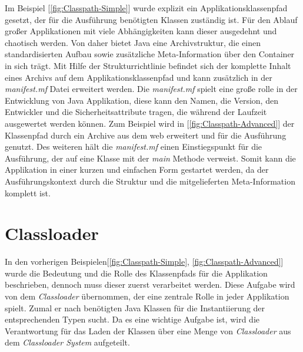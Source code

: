   Im Beispiel [\ref{fig:Classpath-Simple}] wurde explizit ein Applikationsklassenpfad gesetzt, der für die Ausführung benötigten Klassen zuständig ist. 
  Für den Ablauf großer Applikationen mit viele Abhängigkeiten kann dieser ausgedehnt und chaotisch werden. 
  Von daher bietet Java eine Archivstruktur, die einen standardisierten Aufbau sowie zusätzliche Meta-Information über den Container in sich trägt. 
  Mit Hilfe der Strukturrichtlinie befindet sich der komplette Inhalt eines Archivs auf dem Applikationsklassenpfad und kann zusätzlich in der \textit{manifest.mf} Datei erweitert werden. 
  Die \textit{manifest.mf} spielt eine große rolle in der Entwicklung von Java Applikation, diese kann den Namen, die Version, den Entwickler und die Sicherheitsattribute tragen, die während der Laufzeit ausgewertet werden können. Zum Beispiel wird in [\ref{fig:Classpath-Advanced}] der Klassenpfad durch ein Archive aus dem web erweitert und für die Ausführung genutzt. 
  Des weiteren hält die \textit{manifest.mf} einen Einstiegspunkt für die Ausführung, der auf eine Klasse mit der \textit{main} Methode verweist. 
  Somit kann die Applikation in einer kurzen und einfachen Form gestartet werden, da der Ausführungskontext durch die Struktur und die mitgelieferten Meta-Information komplett ist.
\section{Classloader}\label{ssub:classloader}
  In den vorherigen Beispielen[\ref{fig:Classpath-Simple}, \ref{fig:Classpath-Advanced}] wurde die Bedeutung und die Rolle des Klassenpfads für die Applikation beschrieben, dennoch muss dieser zuerst verarbeitet werden. 
  Diese Aufgabe wird von dem \textit{Classloader} übernommen, der eine zentrale Rolle in jeder Applikation spielt. 
  Zumal er nach benötigten Java Klassen für die Instantiierung der entsprechenden Typen sucht. 
  Da es eine wichtige Aufgabe ist, wird die Verantwortung für das Laden der Klassen über eine Menge von \textit{Classloader} aus dem \textit{Classloader System} aufgeteilt. 

